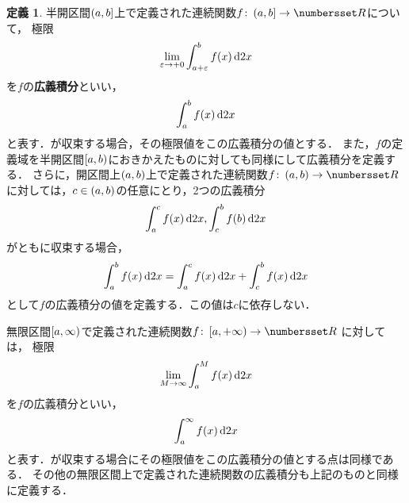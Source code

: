 \documentclass[11pt,a4paper]{ltjsarticle}
\newcommand*{\definition}[1]{\textbf{#1}}
\newcommand*{\maparrow}{\rightarrow}
\newcommand*{\intd}{\dl2}
\theoremstyle{definition}
\newtheorem{dfn}{定義}[section]
\begin{document}
\begin{dfn} \label{dfn:impint}
  半開区間$\interval{lop}{a,b}$上で定義された連続関数$f \colon \interval{lop}{a,b} \maparrow \Real$について，
  極限
  \begin{align}
    \lim_{\varepsilon \to +0} \int_{a + \varepsilon}^b \apply{f}{x} \intd x
    \label{eq:impintlim}
  \end{align}
  を$f$の\definition{広義積分}といい，
  \begin{align}
    \int_a^b \apply{f}{x} \intd x
    \label{eq:impint}
  \end{align}
  と表す．が収束する場合，その極限値をこの広義積分の値とする．
  また，$f$の定義域を半開区間$\interval{rop}{a,b}$におきかえたものに対しても同様にして広義積分を定義する．
  さらに，開区間上$\interval{op}{a,b}$上で定義された連続関数$f \colon \interval{op}{a,b} \maparrow \Real$
  に対しては，$c \in \interval{op}{a,b}$の任意にとり，2つの広義積分
  \begin{align*}
    \int_a^c \apply{f}{x} \intd x , \int_c^b \apply{f}{b} \intd x
  \end{align*}
  がともに収束する場合，
  \begin{align}
    \int_a^b \apply{f}{x} \intd x = \int_a^c \apply{f}{x} \intd x + \int_c^b \apply{f}{x} \intd x
    \label{eq:impintop}
  \end{align}
  として$f$の広義積分の値を定義する．この値は$c$に依存しない．

  無限区間$\interval{rop}{a, \infty}$で定義された連続関数$f \colon \interval{rop}{a , +\infty} \maparrow \Real$
  に対しては，
  極限
  \begin{align}
    \lim_{M \to \infty} \int_a^M \apply{f}{x} \intd x
    \label{eq:impliminfty}
  \end{align}
  を$f$の広義積分といい，
  \begin{align}
    \int_a^{\infty} \apply{f}{x} \intd x
    \label{eq:impintinfty}
  \end{align}
  と表す．が収束する場合にその極限値をこの広義積分の値とする点は同様である．
  その他の無限区間上で定義された連続関数の広義積分も上記のものと同様に定義する．
\end{dfn}
\end{document}
